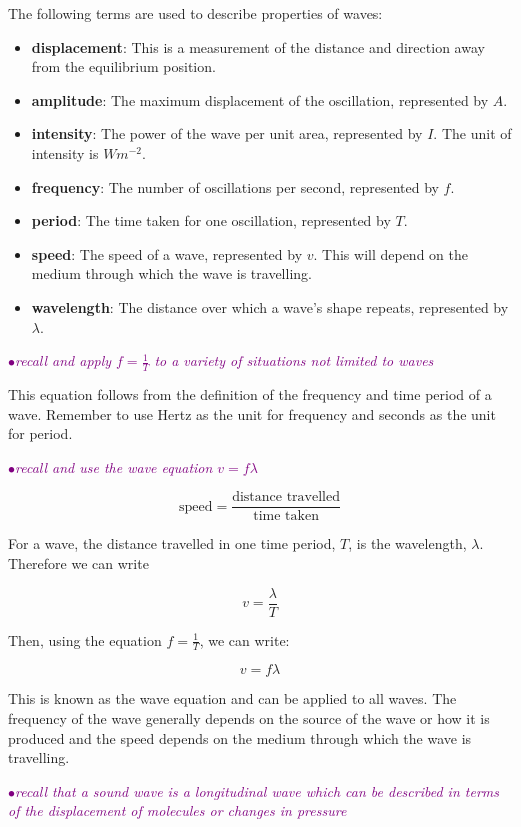 \documentclass[a4paper,11pt,twoside]{memoir}
\newcounter{spec}[chapter]
\newcommand{\spec}[1]{\Needspace{5\baselineskip}\textcolor{purple}{$\bullet$\hspace{0.5cm}\textit{#1}}}
\begin{document}
The following terms are used to describe properties of waves:
\begin{itemize}
\item \textbf{displacement}: This is a measurement of the distance and direction away from the equilibrium position.
\item \textbf{amplitude}: The maximum displacement of the oscillation, represented by $A$.
\item \textbf{intensity}: The power of the wave per unit area, represented by $I$. The unit of intensity is $Wm^{-2}$.
\item \textbf{frequency}: The number of oscillations per second, represented by $f$.
\item \textbf{period}: The time taken for one oscillation, represented by $T$.
\item \textbf{speed}: The speed of a wave, represented by $v$. This will depend on the medium through which the wave is travelling.
\item \textbf{wavelength}: The distance over which a wave's shape repeats, represented by $\lambda$.

\end{itemize}

\spec{recall and apply $f = \frac{1}{T}$ to a variety of situations not limited to waves}

This equation follows from the definition of the frequency and time period of a wave. Remember to use Hertz as the unit for frequency and seconds as the unit for period.

\spec{recall and use the wave equation $v=f\lambda$}

$$\text{speed} = \frac{\text{distance travelled}}{\text{time taken}}$$

For a wave, the distance travelled in one time period, $T$, is the wavelength, $\lambda$. Therefore we can write

\[v = \frac{\lambda}{T}\]

Then, using the equation $f=\frac{1}{T}$, we can write:

$$v = f\lambda$$

This is known as the wave equation and can be applied to all waves. The frequency of the wave generally depends on the source of the wave or how it is produced and the speed depends on the medium through which the wave is travelling.

\spec{recall that a sound wave is a longitudinal wave which can be described in terms of the displacement of molecules or changes in pressure}
\end{document}
